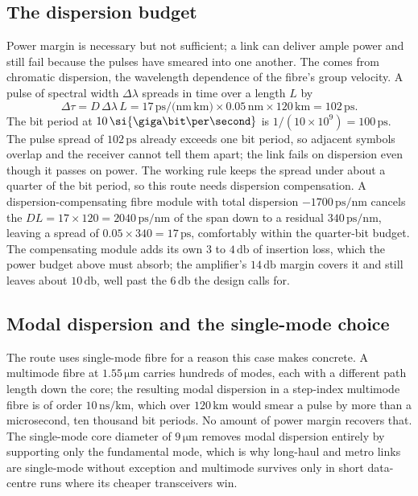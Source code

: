 

\subsection{The dispersion budget}

Power margin is necessary but not sufficient; a link can deliver ample power
and still fail because the pulses have smeared into one another. The
 comes from chromatic dispersion, the
wavelength dependence of the fibre's group velocity. A pulse of spectral
width $\Delta\lambda$ spreads in time over a length $L$ by
\[
\Delta\tau = D\,\Delta\lambda\,L = 17\,\si{\pico\second/(\nano\meter\,\kilo
\meter)}\times 0.05\,\si{\nano\meter}\times 120\,\si{\kilo\meter} = 102\,\si{
\pico\second}.
\]
The bit period at $10\,\si{\giga\bit\per\second}$ is
$1/(10\times10^{9}) = 100\,\si{\pico\second}$. The pulse spread of
$102\,\si{\pico\second}$ already exceeds one bit period, so adjacent symbols
overlap and the receiver cannot tell them apart; the link fails on dispersion
even though it passes on power. The working rule keeps the spread under about
a quarter of the bit period, so this route needs dispersion compensation. A
dispersion-compensating fibre module with total dispersion
$-1700\,\si{\pico\second/\nano\meter}$ cancels the
$D L = 17\times 120 = 2040\,\si{\pico\second/\nano\meter}$ of the span down to
a residual $340\,\si{\pico\second/\nano\meter}$, leaving a spread of
$0.05\times 340 = 17\,\si{\pico\second}$, comfortably within the quarter-bit
budget. The compensating module adds its own $3$ to $4\,\si{\decibel}$ of
insertion loss, which the power budget above must absorb; the amplifier's
$14\,\si{\decibel}$ margin covers it and still leaves about $10\,\si{\decibel}$,
well past the $6\,\si{\decibel}$ the design calls for.

\subsection{Modal dispersion and the single-mode choice}

The route uses single-mode fibre for a reason this case makes concrete. A
multimode fibre at $1.55\,\si{\micro\meter}$ carries hundreds of modes, each
with a different path length down the core; the resulting modal dispersion in
a step-index multimode fibre is of order
$10\,\si{\nano\second\per\kilo\meter}$, which over $120\,\si{\kilo\meter}$
would smear a pulse by more than a microsecond, ten thousand bit periods. No
amount of power margin recovers that. The single-mode core diameter of
$9\,\si{\micro\meter}$ removes modal dispersion entirely by supporting only
the fundamental mode, which is why long-haul and metro links are single-mode
without exception and multimode survives only in short data-centre runs where
its cheaper transceivers win.

